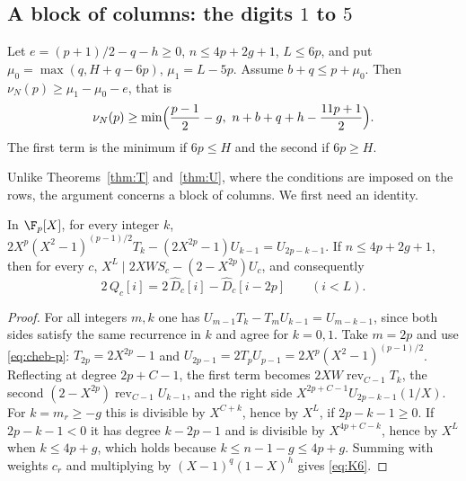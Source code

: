 \subsection{A block of columns: the digits $1$ to $5$}
\begin{theorem}\label{thm:U6}
Let $e=(p+1)/2-q-h\ge0$, $n\le4p+2g+1$, $L\le6p$, and put $\mu_0=\max(q,H+q-6p)$, $\mu_1=L-5p$. Assume
$b+q\le p+\mu_0$. Then $\nu_N(p)\ge\mu_1-\mu_0-e$, that is
\[
 \nu_N(p)\ge\min\Bigl(\frac{p-1}2-g,\ n+b+q+h-\frac{11p+1}2\Bigr).
\]
The first term is the minimum if $6p\le H$ and the second if $6p\ge H$.
\end{theorem}

Unlike Theorems~\ref{thm:T} and~\ref{thm:U}, where the conditions are imposed on the rows, the argument
concerns a block of columns. We first need an identity.

\begin{lemma}\label{lem:K6}
In $\F_p[X]$, for every integer $k$, $2X^p(X^2-1)^{(p-1)/2}T_k-(2X^{2p}-1)U_{k-1}=U_{2p-k-1}$. If
$n\le4p+2g+1$, then for every $c$, $X^L\mid 2XWS_c-(2-X^{2p})U_c$, and consequently
\begin{equation}\label{eq:K6}
 2\,Q_c[i]=2\,\widehat D_c[i]-\widehat D_c[i-2p]\qquad(i<L).
\end{equation}
\end{lemma}

\begin{proof}
For all integers $m,k$ one has $U_{m-1}T_k-T_mU_{k-1}=U_{m-k-1}$, since both sides satisfy the same
recurrence in $k$ and agree for $k=0,1$. Take $m=2p$ and use \eqref{eq:cheb-p}:
$T_{2p}=2X^{2p}-1$ and $U_{2p-1}=2T_pU_{p-1}=2X^p(X^2-1)^{(p-1)/2}$. Reflecting at degree $2p+C-1$, the first
term becomes $2XW\operatorname{rev}_{C-1}T_k$, the second $(2-X^{2p})\operatorname{rev}_{C-1}U_{k-1}$, and the
right side $X^{2p+C-1}U_{2p-k-1}(1/X)$. For $k=m_r\ge-g$ this is divisible by $X^{C+k}$, hence by $X^L$, if
$2p-k-1\ge0$. If $2p-k-1<0$ it has degree $k-2p-1$ and is divisible by $X^{4p+C-k}$, hence by $X^L$ when
$k\le4p+g$, which holds because $k\le n-1-g\le4p+g$. Summing with weights $c_r$ and multiplying by
$(X-1)^q(1-X)^h$ gives \eqref{eq:K6}.
\end{proof}

